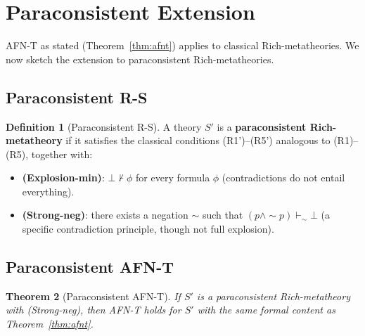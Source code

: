 \documentclass[11pt]{article}
\theoremstyle{plain}
\newtheorem{theorem}{Theorem}[section]
\theoremstyle{definition}
\newtheorem{definition}[theorem]{Definition}
\begin{document}
\section{Paraconsistent Extension}\label{app:paraconsistent}

AFN-T as stated (Theorem~\ref{thm:afnt}) applies to classical Rich-metatheories. We now sketch the extension to paraconsistent Rich-metatheories.

\subsection{Paraconsistent R-S}

\begin{definition}[Paraconsistent R-S]\label{def:paraconsistent-rs}
A theory $S'$ is a \textbf{paraconsistent Rich-metatheory} if it satisfies the classical conditions (R1')--(R5') analogous to (R1)--(R5), together with:
\begin{itemize}
\item \textbf{(Explosion-min)}: $\bot \not\vdash \phi$ for every formula $\phi$ (contradictions do not entail everything).
\item \textbf{(Strong-neg)}: there exists a negation $\sim$ such that $(p \wedge \sim p) \vdash_\sim \bot$ (a specific contradiction principle, though not full explosion).
\end{itemize}
\end{definition}

\subsection{Paraconsistent AFN-T}

\begin{theorem}[Paraconsistent AFN-T]\label{thm:paraconsistent-afnt}
If $S'$ is a paraconsistent Rich-metatheory with (Strong-neg), then AFN-T holds for $S'$ with the same formal content as Theorem~\ref{thm:afnt}.
\end{theorem}
\end{document}
